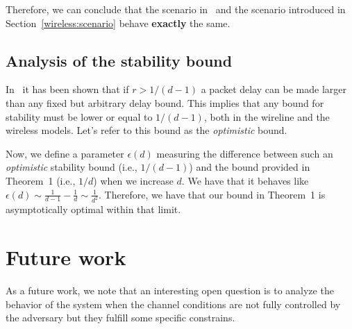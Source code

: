 \documentclass[journal,twocolumn]{./IEEEtran}
\begin{document}
Therefore, we can conclude that the scenario in~\cite{DBLP:journals/ton/BennettBCCB02}  and the scenario introduced in Section~\ref{wireless:scenario} behave {\bf exactly} the same.


\subsection{Analysis of the stability bound}

In~\cite{DBLP:journals/ton/BennettBCCB02} it has been shown that if $r > 1/(d-1)$ a packet delay can be made larger than any fixed but arbitrary delay bound. This implies that any bound for stability must be lower or equal to  $1/(d-1)$, both in the wireline and the wireless models.  Let's refer to this bound as the \emph{optimistic} bound.







Now, we define a parameter $\epsilon(d)$ measuring the difference between such an \emph{optimistic} stability bound (i.e., $1/(d-1)$) and the bound provided in Theorem~1 (i.e., $1/d$) when we increase $d$. We have that it behaves like $\epsilon(d) \sim \frac{1}{d-1} - \frac{1}{d} \sim \frac{1}{d^2}$. Therefore, we have that our bound in Theorem~1 is asymptotically optimal within that limit.













\section{Future work}
As a future work, we note that an interesting open question is to analyze the behavior of the system when the channel conditions are not fully controlled by the adversary but they fulfill some specific constrains.


\end{document}
